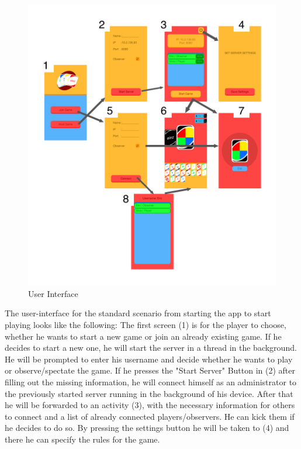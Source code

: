 \documentclass{sig-alternate}
\newcommand{\lfig}[1]{\label{fig:#1}}
\begin{document}
\begin{figure}[!htbp]
	\centering
    \includegraphics[width=\columnwidth]{Artboard.png}
    \vspace{-5mm} %
	\caption{User Interface}
	\lfig{artboard}
\end{figure}

The user-interface for the standard scenario from starting the app to start playing looks like the following: The first screen (1) is for the player to choose, whether he wants to start a new game or join an already existing game. If he decides to start a new one, he will start the server in a thread in the background. He will be prompted to enter his username and decide whether he wants to play or observe/spectate the game. If he presses the "Start Server" Button in (2) after filling out the missing information, he will connect himself as an administrator to the previously started server running in the background of his device. After that he will be forwarded to an activity (3), with the necessary information for others to connect and a list of already connected players/observers. He can kick them if he decides to do so. By pressing the settings button he will be taken to (4) and there he can specify the rules for the game.
\end{document}
